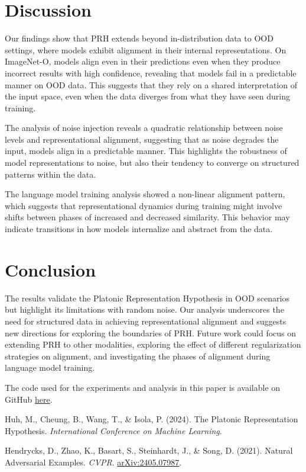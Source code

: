 \documentclass[10pt,a4paper]{article}
\begin{document}
\section{Discussion}
Our findings show that PRH extends beyond in-distribution data to OOD settings, where models exhibit alignment in their internal representations. On ImageNet-O, models align even in their predictions even when they produce incorrect results with high confidence, revealing that models fail in a predictable manner on OOD data. This suggests that they rely on a shared interpretation of the input space, even when the data diverges from what they have seen during training.

The analysis of noise injection reveals a quadratic relationship between noise levels and representational alignment, suggesting that as noise degrades the input, models align in a predictable manner. This highlights the robustness of model representations to noise, but also their tendency to converge on structured patterns within the data.

The language model training analysis showed a non-linear alignment pattern, which suggests that representational dynamics during training might involve shifts between phases of increased and decreased similarity. This behavior may indicate transitions in how models internalize and abstract from the data.

\section{Conclusion}
The results validate the Platonic Representation Hypothesis in OOD scenarios but highlight its limitations with random noise. Our analysis underscores the need for structured data in achieving representational alignment and suggests new directions for exploring the boundaries of PRH. Future work could focus on extending PRH to other modalities, exploring the effect of different regularization strategies on alignment, and investigating the phases of alignment during language model training.

\vfill
The code used for the experiments and analysis in this paper is available on GitHub \href{https://github.com/rokosbasilisk/prh-experiments}{here}.

\clearpage
\begin{thebibliography}{9}

Huh, M., Cheung, B., Wang, T., \& Isola, P. (2024). The Platonic Representation Hypothesis. \emph{International Conference on Machine Learning}.

Hendrycks, D., Zhao, K., Basart, S., Steinhardt, J., \& Song, D. (2021). Natural Adversarial Examples. \emph{CVPR}. \href{https://arxiv.org/abs/2405.07987}{arXiv:2405.07987}.

\end{thebibliography}
\end{document}
